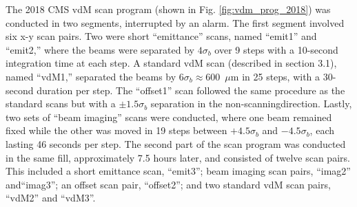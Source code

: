 The 2018 CMS vdM scan program (shown in Fig. \ref{fig:vdm_prog_2018}) was conducted in two segments, interrupted by an alarm. The first segment involved six x-y scan pairs. Two were short ``emittance'' scans, named ``emit1'' and ``emit2,'' where the beams were separated by \(4\sigma_b\) over 9 steps with a 10-second integration time at each step. A standard vdM scan (described in section 3.1), named ``vdM1,'' separated the beams by \(6\sigma_b \approx 600\)~$\mu$m in 25 steps, with a 30-second duration per step. The ``offset1'' scan followed the same procedure as the standard scans but with a \(\pm 1.5\sigma_b\) separation in the non-scanningdirection. Lastly, two sets of ``beam imaging'' scans were conducted, where one beam remained fixed while the other was moved in 19 steps between \(+4.5\sigma_b\) and \(-4.5\sigma_b\), each lasting 46 seconds per step. The second part of the scan program was conducted in the same fill, approximately 7.5 hours later, and consisted of twelve scan pairs. This included a short emittance scan, ``emit3''; beam imaging scan pairs, ``imag2'' and``imag3''; an offset scan pair, ``offset2''; and two standard vdM scan pairs, ``vdM2'' and ``vdM3''.

